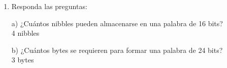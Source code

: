 \documentclass[a4paper, 12pt]{article}
\newcommand{\Aspace}{0.2cm}
\begin{document}
\begin{enumerate}
        \item Responda las preguntas:
            \vspace{\Aspace} \par
            a) ¿Cuántos nibbles pueden almacenarse en una palabra de 16 bits?
            \\ { \color{azul} 4 nibbles }

            \vspace{\Aspace} \par
            b) ¿Cuántos bytes se requieren para formar una palabra de 24 bits?
            \\ { \color{azul} 3 bytes }
    \end{enumerate}
\end{document}
